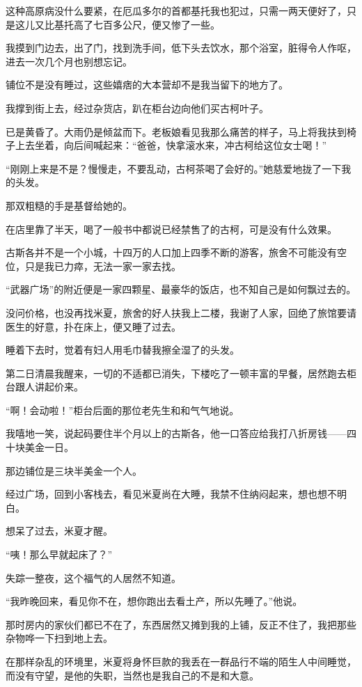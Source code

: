 \par 这种高原病没什么要紧，在厄瓜多尔的首都基托我也犯过，只需一两天便好了，只是这儿又比基托高了七百多公尺，便又惨了一些。
\par 我摸到门边去，出了门，找到洗手间，低下头去饮水，那个浴室，脏得令人作呕，进去一次几个月也别想忘记。
\par 铺位不是没有睡过，这些嬉痞的大本营却不是我当留下的地方了。
\par 我撑到街上去，经过杂货店，趴在柜台边向他们买古柯叶子。
\par 已是黄昏了。大雨仍是倾盆而下。老板娘看见我那么痛苦的样子，马上将我扶到椅子上去坐着，向后间喊起来：“爸爸，快拿滚水来，冲古柯给这位女士喝！”
\par “刚刚上来是不是？慢慢走，不要乱动，古柯茶喝了会好的。”她慈爱地拢了一下我的头发。
\par 那双粗糙的手是基督给她的。
\par 在店里靠了半天，喝了一般书中都说已经禁售了的古柯，可是没有什么效果。
\par 古斯各并不是一个小城，十四万的人口加上四季不断的游客，旅舍不可能没有空位，只是我已力瘁，无法一家一家去找。
\par “武器广场”的附近便是一家四颗星、最豪华的饭店，也不知自己是如何飘过去的。
\par 没问价格，也没再找米夏，旅舍的好人扶我上二楼，我谢了人家，回绝了旅馆要请医生的好意，扑在床上，便又睡了过去。
\par 睡着下去时，觉着有妇人用毛巾替我擦全湿了的头发。
\par 第二日清晨我醒来，一切的不适都已消失，下楼吃了一顿丰富的早餐，居然跑去柜台跟人讲起价来。
\par “啊！会动啦！”柜台后面的那位老先生和和气气地说。
\par 我嘻地一笑，说起码要住半个月以上的古斯各，他一口答应给我打八折房钱——四十块美金一日。
\par 那边铺位是三块半美金一个人。
\par 经过广场，回到小客栈去，看见米夏尚在大睡，我禁不住纳闷起来，想也想不明白。
\par 想呆了过去，米夏才醒。
\par “咦！那么早就起床了？”
\par 失踪一整夜，这个福气的人居然不知道。
\par “我昨晚回来，看见你不在，想你跑出去看土产，所以先睡了。”他说。
\par 那时房内的家伙们都已不在了，东西居然又摊到我的上铺，反正不住了，我把那些杂物哗一下扫到地上去。
\par 在那样杂乱的环境里，米夏将身怀巨款的我丢在一群品行不端的陌生人中间睡觉，而没有守望，是他的失职，当然也是我自己的不是和大意。
